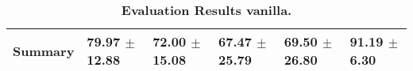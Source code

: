 \begin{table}[htb]
{\begin{tabular}{llllll}
\midrule
\textbf{Summary                                  } &                  \phantom{0}79.97 $\pm$ 12.88 &                      \phantom{0}72.00 $\pm$ 15.08 &                  \phantom{0}67.47 $\pm$ 25.79 &                  \phantom{0}69.50 $\pm$ 26.80 &  \phantom{0}91.19 $\pm$ \phantom{0}6.30 \\
\bottomrule
\end{tabular}%
}
\caption{\textbf{Evaluation Results vanilla.}}
\label{tab:eval-results}
\end{table}


